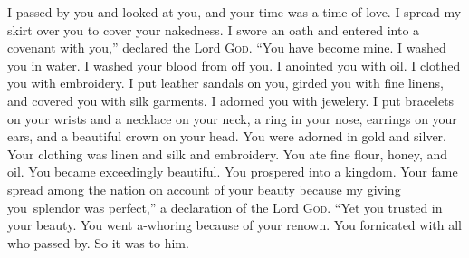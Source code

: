 
\begin{inparaenum}
     I passed by you and looked at you, and your time was a time of love. I spread my skirt over you to cover your nakedness. I swore an oath and entered into a covenant with you,'' declared the Lord \textsc{God}. ``You have become mine.%
     I washed you in water. I washed your blood from off you. I anointed you with oil.%
     I clothed you with embroidery. I put leather sandals on you, girded you with fine linens, and covered you with silk garments.%
     I adorned you with jewelery. I put bracelets on your wrists and a necklace on your neck,%
     a ring in your nose, earrings on your ears, and a beautiful crown on your head.%
     You were adorned in gold and silver. Your clothing was linen and silk and embroidery. You ate fine flour, honey, and oil. You became exceedingly beautiful. You prospered into a kingdom.%
     Your fame spread among the nation on account of your beauty because my giving you\understood\ splendor was perfect,'' a declaration of the Lord \textsc{God}.%
     ``Yet you trusted in your beauty. You went a-whoring because of your renown. You fornicated with all who passed by. So it was to him.%
    

\end{inparaenum}
